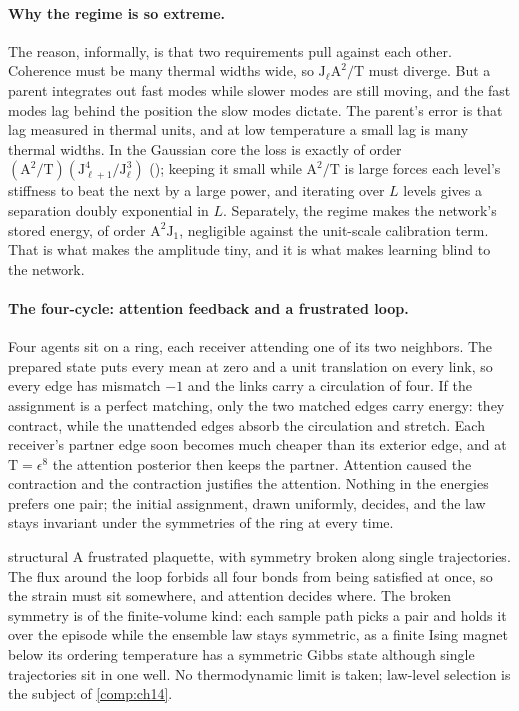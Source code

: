 \paragraph{Why the regime is so extreme.}
The reason, informally, is that two requirements pull against each other. Coherence must be many thermal
widths wide, so \(\mathrm J_\ell\mathrm A^2/\mathrm T\) must diverge. But a parent integrates out fast modes
while slower modes are still moving, and the fast modes lag behind the position the slow modes dictate.
The parent's error is that lag measured in thermal units, and at low temperature a small lag is many
thermal widths. In the Gaussian core the loss is exactly of order
\((\mathrm A^2/\mathrm T)(\mathrm J_{\ell+1}^4/\mathrm J_\ell^3)\) (); keeping
it small while \(\mathrm A^2/\mathrm T\) is large forces each level's stiffness to beat the next by a large
power, and iterating over \(L\) levels gives a separation doubly exponential in \(L\). Separately, the
regime makes the network's stored energy, of order \(\mathrm A^2\mathrm J_1\), negligible against the
unit-scale calibration term. That is what makes the amplitude tiny, and it is what makes learning blind
to the network.

\paragraph{The four-cycle: attention feedback and a frustrated loop.}
Four agents sit on a ring, each receiver attending one of its two neighbors. The prepared state puts
every mean at zero and a unit translation on every link, so every edge has mismatch \(-1\) and the links
carry a circulation of four. If the assignment is a perfect matching, only the two matched edges carry
energy: they contract, while the unattended edges absorb the circulation and stretch. Each receiver's
partner edge soon becomes much cheaper than its exterior edge, and at \(\mathrm T=\epsilon^8\) the attention
posterior then keeps the partner. Attention caused the contraction and the contraction justifies the
attention. Nothing in the energies prefers one pair; the initial assignment, drawn uniformly, decides, and
the law stays invariant under the symmetries of the ring at every time.

\begin{analogy}{structural}
A frustrated plaquette, with symmetry broken along single trajectories. The flux around the loop forbids
all four bonds from being satisfied at once, so the strain must sit somewhere, and attention decides
where. The broken symmetry is of the finite-volume kind: each sample path picks a pair and holds it over
the episode while the ensemble law stays symmetric, as a finite Ising magnet below its ordering
temperature has a symmetric Gibbs state although single trajectories sit in one well. No thermodynamic
limit is taken; law-level selection is the subject of \cref{comp:ch14}.
\end{analogy}

